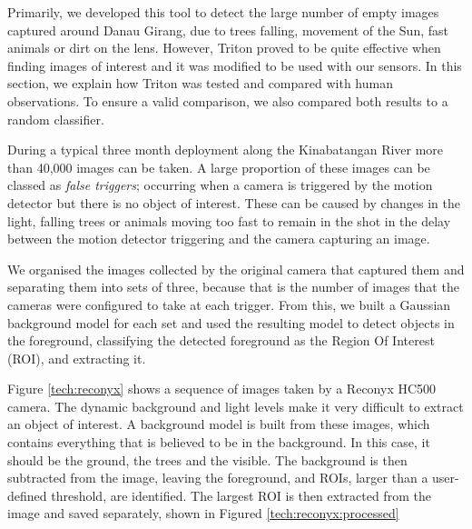 		Primarily, we developed this tool to detect the large number of empty images captured around Danau Girang, due to trees falling, movement of the Sun, fast animals or dirt on the lens. However, Triton proved to be quite effective when finding images of interest and it was modified to be used with our sensors. In this section, we explain how Triton was tested and compared with human observations. To ensure a valid comparison, we also compared both results to a random classifier.
	
		During a typical three month deployment along the Kinabatangan River more than 40,000 images can be taken. A large proportion of these images can be classed as \textit{false triggers}; occurring when a camera is triggered by the motion detector but there is no object of interest. These can be caused by changes in the light, falling trees or animals moving too fast to remain in the shot in the delay between the motion detector triggering and the camera capturing an image.
		
		We organised the images collected by the original camera that captured them and separating them into sets of three, because that is the number of images that the cameras were configured to take at each trigger. From this, we built a Gaussian background model \cite{Zivkovic2004} for each set and used the resulting model to detect objects in the foreground, classifying the detected foreground as the Region Of Interest (ROI), and extracting it.
	
		Figure \ref{tech:reconyx} shows a sequence of images taken by a Reconyx HC500 camera. The dynamic background and light levels make it very difficult to extract an object of interest. A background model is built from these images, which contains everything that is believed to be in the background. In this case, it should be the ground, the trees and the visible. The background is then subtracted from the image, leaving the foreground, and ROIs, larger than a user-defined threshold, are identified. The largest ROI is then extracted from the image and saved separately, shown in Figured \ref{tech:reconyx:processed}

